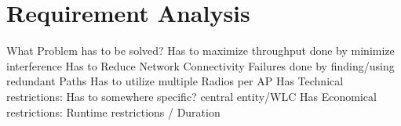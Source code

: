 \chapter{Requirement Analysis}
What Problem has to be solved?\newline
Has to maximize throughput\newline
	done by minimize interference\newline
Has to Reduce Network Connectivity Failures\newline
	done by finding/using redundant Paths\newline
Has to utilize multiple Radios per AP\newline
Has Technical restrictions:\newline
	Has to somewhere specific?\newline
		central entity/WLC\newline
Has Economical restrictions:\newline
	Runtime restrictions / Duration\newline

